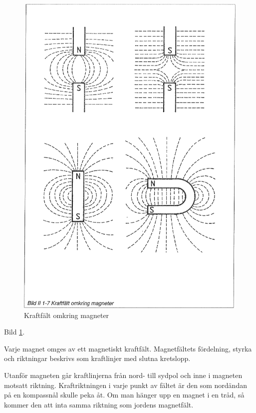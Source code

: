 \begin{figure}
\begin{center}
\includegraphics[width=14cm]{images/bild_2_1-07}
\caption{Kraftfält omkring magneter}
\label{fig:BildII1-7}
\end{center}
\end{figure}

Bild \ref{fig:BildII1-7}.

Varje magnet omges av ett magnetiskt kraftfält. Magnetfältets fördelning,
styrka och riktningar beskrivs som kraftlinjer med slutna kretslopp.

Utanför magneten går kraftlinjerna från nord- till sydpol och inne i magneten 
motsatt riktning. Kraftriktningen i varje punkt av fältet är den som nordändan
på en kompassnål skulle peka åt. Om man hänger upp en magnet i en tråd, så
kommer den att inta samma riktning som jordens magnetfält.

